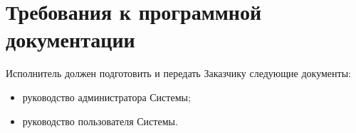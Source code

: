 \documentclass{bmstu-gost-7-32}
\begin{document}

\section{Требования к программной документации}



Исполнитель должен подготовить и передать Заказчику следующие документы:
\begin{itemize}
	\item руководство администратора Системы;
	\item руководство пользователя Системы.
\end{itemize}




\end{document}
